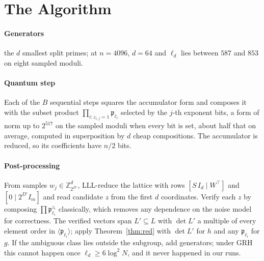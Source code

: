 \documentclass[conference]{IEEEtran}
\newcommand{\Z}{\mathbb{Z}}
\newcommand{\p}{\mathfrak{p}}
\begin{document}
\section{The Algorithm}\label{sec:alg}
\paragraph*{Generators} the $d$ smallest split primes; at $n=4096$, $d=64$ and $\ell_d$ lies between $587$ and $853$ on eight sampled moduli.

\paragraph*{Quantum step} Each of the $B$ sequential steps squares the accumulator form and composes it with the subset product $\prod_{i:z_{i,j}=1}\p_{\ell_i}$ selected by the $j$-th exponent bits, a form of norm up to $2^{517}$ on the sampled moduli when every bit is set, about half that on average, computed in superposition by $d$ cheap compositions. The accumulator is reduced, so its coefficients have $n/2$ bits.

\paragraph*{Post-processing} From samples $w_j\in\Z_{2^{D'}}^d$, LLL-reduce the lattice with rows $[S\,I_d\mid W^\top]$ and $[0\mid2^{D'}I_m]$ and read candidate $z$ from the first $d$ coordinates. Verify each $z$ by composing $\prod\p_{\ell_i}^{z_i}$ classically, which removes any dependence on the noise model for correctness. The verified vectors span $L'\subseteq L$ with $\det L'$ a multiple of every element order in $\langle\p_{\ell_i}\rangle$; apply Theorem~\ref{thm:red} with $\det L'$ for $h$ and any $\p_{\ell_i}$ for $g$. If the ambiguous class lies outside the subgroup, add generators; under GRH this cannot happen once $\ell_d\ge6\log^2N$, and it never happened in our runs.
\end{document}
